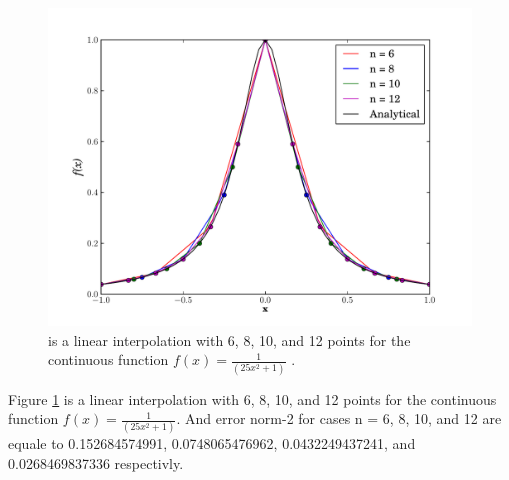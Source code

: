 \documentclass[10pt]{article}
\begin{document}
\begin{figure}[h]
  \begin{center}
    \includegraphics[totalheight=0.6\textheight]{plot6.pdf}
    \caption{\label{fig:Interpol2} is a linear interpolation with 6, 8, 10, and 12 points for the continuous function $f(x) = \frac{1}{(25x^2 + 1)}$ .}
  \end{center}
\end{figure}

Figure \ref{fig:Interpol2} is a linear interpolation with 6, 8, 10, and 12 points for the continuous function $f(x) = \frac{1}{(25x^2 + 1)}$. And error norm-2 for cases n = 6, 8, 10, and 12 are equale to 0.152684574991, 0.0748065476962, 0.0432249437241, and 0.0268469837336 respectivly.\\
\end{document}
